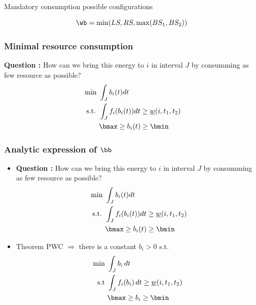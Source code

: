 \begin{frame}{Mandatory consumption possible configurations}
  
  \[\wb = \min ( LS, RS, \max (BS_1,BS_2))\]
\end{frame}

\begin{frame}
  \frametitle{Minimal resource consumption}
  \begin{center}
    
  \end{center}
  \vfill
  \textbf{Question : }
  How can we bring this energy to $i$ in interval $J$ by consumming as few resource as possible?
  \vfill
  \begin{align*}
    \text{ min }& \int_{J} b_i(t)dt  \\
    \text{ s.t. } & \int_{J}f_i(b_i(t))dt \ge  \underline{w}(i,t_1,t_2) \\
                &  \bmax \ge b_i(t) \ge \bmin
  \end{align*}
  \vfill
\end{frame}

\begin{frame}
  \frametitle{Analytic expression of $\bb$}
  \vfill
  \begin{itemize}
  \item  \textbf{Question : }
    How can we bring this energy to $i$ in interval $J$ by consumming as few resource as possible?
    \vfill
    \begin{align*}
      \text{ min }& \int_{J} b_i(t)dt  \\
      \text{ s.t. } & \int_{J}f_i(b_i(t))dt \ge  \underline{w}(i,t_1,t_2) \\
                  &  \bmax \ge b_i(t) \ge \bmin
    \end{align*}
    \vfill
  \item Theorem PWC $\Rightarrow$ there is a constant $b_{i} > 0 $
    s.t. 
    \begin{align*}
      \text{min }  & \int_{J} b_i\,dt  \\
      \text{s.t } & \int_{J}f_i(b_i)\,dt \ge
                    \underline{w}(i,t_1,t_2)\\
                   & \bmax \ge b_i \ge \bmin
    \end{align*}
  \end{itemize}
  \vfill
\end{frame}

